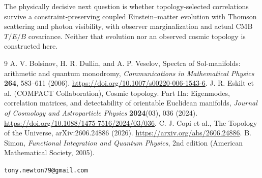 \documentclass[11pt,a4paper]{article}
\begin{document}
The physically decisive next question
is whether topology-selected
correlations survive a
constraint-preserving coupled
Einstein--matter evolution with
Thomson scattering and photon
visibility, with observer
marginalization and actual CMB
$T/E/B$ covariance. Neither
that evolution nor an observed
cosmic topology is constructed here.

\begin{thebibliography}{9}
 A. V. Bolsinov, H. R. Dullin,
and A. P. Veselov,
Spectra of Sol-manifolds: arithmetic and quantum monodromy,
\emph{Communications in Mathematical Physics}
\textbf{264}, 583--611 (2006).
\url{https://doi.org/10.1007/s00220-006-1543-6}.
 J. R. Eskilt et al.
(COMPACT Collaboration),
Cosmic topology. Part IIa: Eigenmodes,
correlation matrices, and detectability of
orientable Euclidean manifolds,
\emph{Journal of Cosmology and
Astroparticle Physics}
\textbf{2024}(03), 036 (2024).
\url{https://doi.org/10.1088/1475-7516/2024/03/036}.
 C. J. Copi et al.,
The Topology of the Universe,
arXiv:2606.24886 (2026).
\url{https://arxiv.org/abs/2606.24886}.
 B. Simon,
\emph{Functional Integration and Quantum Physics},
2nd edition (American Mathematical Society, 2005).
\end{thebibliography}

\noindent\texttt{tony.newton79@gmail.com}
\end{document}
